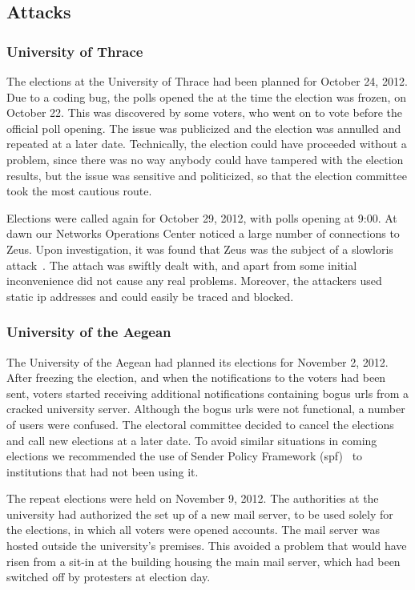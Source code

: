\documentclass[letterpaper,10pt]{article}
\begin{document}
\subsection{Attacks}
\label{ssec:attacks}

\subsubsection{University of Thrace}
\label{sssec:thrace}

The elections at the University of Thrace had been planned for October
24, 2012. Due to a coding bug, the polls opened the at the time the
election was frozen, on October 22. This was discovered by some
voters, who went on to vote before the official poll opening. The
issue was publicized and the election was annulled and repeated at a
later date. Technically, the election could have proceeded without a
problem, since there was no way anybody could have tampered with the
election results, but the issue was sensitive and politicized, so that
the election committee took the most cautious route.

Elections were called again for October 29, 2012, with polls opening
at 9:00. At dawn our Networks Operations Center noticed a large number
of connections to Zeus. Upon investigation, it was found that Zeus was
the subject of a slowloris attack~\cite{slowloris}. The attach was
swiftly dealt with, and apart from some initial inconvenience did not
cause any real problems. Moreover, the attackers used static {\sc ip}
addresses and could easily be traced and blocked.

\subsubsection{University of the Aegean}

The University of the Aegean had planned its elections for November 2,
2012. After freezing the election, and when the notifications to the
voters had been sent, voters started receiving additional
notifications containing bogus {\sc url}s from a cracked university server.
Although the bogus {\sc url}s were not functional, a number of users were
confused. The electoral committee decided to cancel the elections and
call new elections at a later date. To avoid similar situations in
coming elections we recommended the use of Sender Policy Framework
({\sc spf})~\cite{rfc4408} to institutions that had not been using it.

The repeat elections were held on November 9, 2012. The authorities at
the university had authorized the set up of a new mail server, to be
used solely for the elections, in which all voters were opened
accounts. The mail server was hosted outside the university's
premises. This avoided a problem that would have risen from a sit-in
at the building housing the main mail server, which had been switched
off by protesters at election day.
\end{document}
